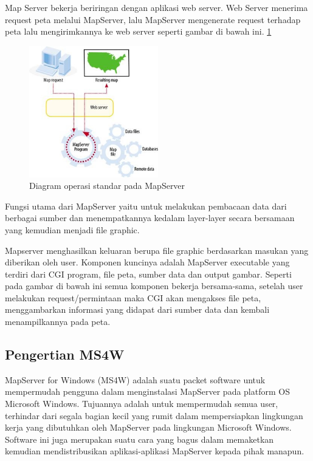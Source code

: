 Map Server bekerja beriringan dengan aplikasi web server. Web Server menerima request peta melalui MapServer, lalu MapServer mengenerate request terhadap peta lalu mengirimkannya ke web server seperti gambar di bawah ini. \ref{gambar5}
\begin{figure}[ht]
	    \centerline{\includegraphics[width=0.50\textwidth]{figures/gambar5.JPG}}
	    \caption{Diagram operasi standar pada MapServer}
		\label{gambar5}
		\end{figure}
Fungsi utama dari MapServer yaitu untuk melakukan pembacaan data dari berbagai sumber dan menempatkannya kedalam layer-layer secara bersamaan yang kemudian menjadi file graphic.

Mapserver menghasilkan keluaran berupa file graphic berdasarkan masukan yang diberikan oleh user. Komponen kuncinya adalah MapServer executable yang terdiri dari CGI program, file peta, sumber data dan output gambar. Seperti pada gambar di bawah ini semua komponen bekerja bersama-sama, setelah user melakukan request/permintaan maka CGI akan mengakses file peta, menggambarkan informasi yang didapat dari sumber data dan kembali menampilkannya pada peta.

\subsection{Pengertian MS4W}
MapServer for Windows (MS4W) adalah suatu packet software untuk mempermudah pengguna dalam menginstalasi MapServer pada platform OS Microsoft Windows. Tujuannya adalah untuk mempermudah semua user, terhindar dari segala bagian kecil yang rumit dalam mempersiapkan lingkungan kerja yang dibutuhkan oleh MapServer pada lingkungan Microsoft Windows. Software ini juga merupakan suatu cara yang bagus dalam memaketkan kemudian mendistribusikan aplikasi-aplikasi MapServer kepada pihak manapun.

